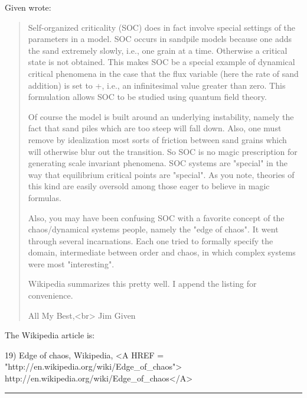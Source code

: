 Given wrote:

\begin{quote}
  Self-organized criticality (SOC) does in fact involve special settings of
  the parameters in a model.
  SOC occurs in sandpile models because one adds the sand extremely slowly,
  i.e., one grain at a time. Otherwise a critical state is not obtained.
  This makes SOC be a special example of dynamical critical phenomena in
  the case that the flux variable (here the rate of sand addition) is set
  to \epsilon +, i.e., an infinitesimal value greater than zero.  This
  formulation allows SOC to be studied using quantum field theory.

  Of course the model is built around an underlying instability, namely
  the fact that sand piles which are too steep will fall down.  Also, one
  must remove by idealization most sorts of friction between sand grains
  which will otherwise blur out the transition.  So SOC is no magic
  prescription for generating scale invariant phenomena.  SOC systems are
  "special" in the way that equilibrium critical points are 
  "special".
  As you note, theories of this kind are easily oversold among those
  eager to believe in magic formulas.

  Also, you may have been confusing SOC with a favorite concept of the
  chaos/dynamical systems people, namely the "edge of chaos".  
   It went
  through several incarnations.  Each one tried to formally specify the
  domain, intermediate between order and chaos, in which complex systems
  were most "interesting".

  Wikipedia summarizes this pretty well.  I append the listing for
  convenience.

  All My Best,<br>
  Jim Given
\end{quote}

The Wikipedia article is:

19) Edge of chaos, Wikipedia, 
<A HREF = "http://en.wikipedia.org/wiki/Edge_of_chaos">
http://en.wikipedia.org/wiki/Edge_of_chaos</A>


\par\noindent\rule{\textwidth}{0.4pt}
